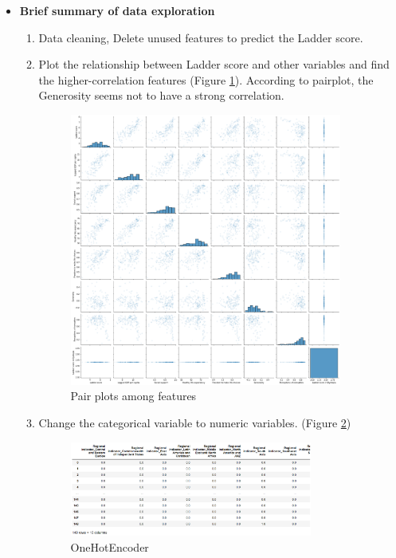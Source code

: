 \documentclass[12pt]{article}
\begin{document}
\begin{itemize}
\item \textbf{Brief summary of data exploration}
    \begin{enumerate}
    \item Data cleaning, Delete unused features to predict the Ladder score.
    \item Plot the relationship between Ladder score and other variables and find the higher-correlation features (Figure \ref{pairplot}). According to pairplot, the Generosity seems not to have a strong correlation.
    
    \begin{figure}[hbt!]
        \centering
        \includegraphics[width=0.9\textwidth]{figures/pairplot.png}
        \caption{Pair plots among features}\label{pairplot}
    \end{figure}
    
    \item Change the categorical variable to numeric variables. (Figure \ref{ohc})
    
    \begin{figure}[hbt!]
        \centering
        \includegraphics[width=0.8\textwidth]{figures/ohc.png}
        \caption{OneHotEncoder}\label{ohc}
    \end{figure}


\end{enumerate}
\end{itemize}
\end{document}
